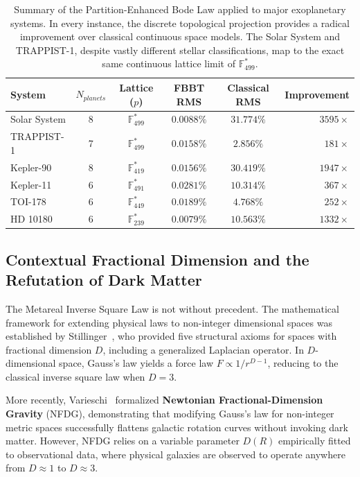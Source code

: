 \begin{table}[ht]
\centering
\renewcommand{\arraystretch}{1.3}
\begin{tabular}{@{}lccccr@{}}
\toprule
\textbf{System} & $N_{planets}$ & \textbf{Lattice ($p$)} & \textbf{FBBT RMS} & \textbf{Classical RMS} & \textbf{Improvement} \\
\midrule
Solar System & 8 & $\mathbb{F}_{499}^*$ & $0.0088\%$ & $31.774\%$ & $3595\times$ \\
TRAPPIST-1 & 7 & $\mathbb{F}_{499}^*$ & $0.0158\%$ & $2.856\%$ & $181\times$ \\
Kepler-90 & 8 & $\mathbb{F}_{419}^*$ & $0.0156\%$ & $30.419\%$ & $1947\times$ \\
Kepler-11 & 6 & $\mathbb{F}_{491}^*$ & $0.0281\%$ & $10.314\%$ & $367\times$ \\
TOI-178 & 6 & $\mathbb{F}_{449}^*$ & $0.0189\%$ & $4.768\%$ & $252\times$ \\
HD 10180 & 6 & $\mathbb{F}_{239}^*$ & $0.0079\%$ & $10.563\%$ & $1332\times$ \\
\bottomrule
\end{tabular}
\caption{Summary of the Partition-Enhanced Bode Law applied to major exoplanetary systems. In every instance, the discrete topological projection provides a radical improvement over classical continuous space models. The Solar System and TRAPPIST-1, despite vastly different stellar classifications, map to the exact same continuous lattice limit of $\mathbb{F}_{499}^*$.}
\label{tab:bode_summary}
\end{table}

\subsection{Contextual Fractional Dimension and the Refutation of Dark Matter}
The Metareal Inverse Square Law is not without precedent. The mathematical framework for extending physical laws to non-integer dimensional spaces was established by Stillinger~\cite{stillinger1977}, who provided five structural axioms for spaces with fractional dimension $D$, including a generalized Laplacian operator. In $D$-dimensional space, Gauss's law yields a force law $F \propto 1/r^{D-1}$, reducing to the classical inverse square law when $D = 3$.

More recently, Varieschi~\cite{varieschi2020} formalized \textbf{Newtonian Fractional-Dimension Gravity} (NFDG), demonstrating that modifying Gauss's law for non-integer metric spaces successfully flattens galactic rotation curves without invoking dark matter. However, NFDG relies on a variable parameter $D(R)$ empirically fitted to observational data, where physical galaxies are observed to operate anywhere from $D \approx 1$ to $D \approx 3$.

